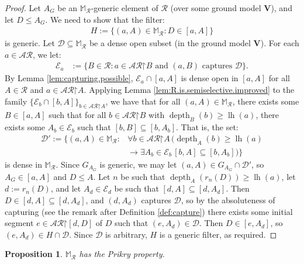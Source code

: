 \documentclass[10pt,a4paper]{amsart}
\theoremstyle{plain}
\numberwithin{equation}{section}
\newtheorem{proposition}[theorem]{Proposition}
\theoremstyle{definition}
\newcommand{\func}{\operatorname}
\newcommand{\cal}{\mathcal}
\renewcommand{\bf}{\mathbf}
\newcommand{\restrictedto}{\mathord{\upharpoonright}}
\newcommand{\V}{\bf{V}}
\newcommand{\lh}{\func{lh}}
\newcommand{\depth}{\func{depth}}
\newcommand{\D}{\cal{D}}
\newcommand{\E}{\cal{E}}
\begin{document}
\begin{proof}
    Let $A_G$ be an $\mathbb{M}_\cal{R}$-generic element of $\cal{R}$ (over some ground model $\V$), and let $D \leq A_G$. We need to show that the filter:
    \begin{align*}
        H := \{(a,A) \in \mathbb{M}_\cal{R} : D \in [a,A]\}
    \end{align*}
    is generic. Let $\D \subseteq \mathbb{M}_\cal{R}$ be a dense open subset (in the ground model $\V$). For each $a \in \cal{AR}$, we let:
    \begin{align*}
        \E_a &:= \{B \in \cal{R} : a \in \cal{AR}\restrictedto B \text{ and $(a,B)$ captures $\D$}\}.
    \end{align*}
    By Lemma \ref{lem:capturing.possible}, $\E_a \cap [a,A]$ is dense open in $[a,A]$ for all $A \in \cal{R}$ and $a \in \cal{AR}\restrictedto A$. Applying Lemma \ref{lem:R.is.semiselective.improved} to the family $\{\E_b \cap [b,A]\}_{b \in \cal{AR}\restrictedto A}$, we have that for all $(a,A) \in \mathbb{M}_\cal{R}$, there exists some $B \in [a,A]$ such that for all $b \in \cal{AR}\restrictedto B$ with $\depth_B(b) \geq \lh(a)$, there exists some $A_b \in \E_b$ such that $[b,B] \subseteq [b,A_b]$. That is, the set:
    \begin{align*}
        \D' := \{(a,A) \in \mathbb{M}_\cal{R} : {}&\forall b \in \cal{AR}\restrictedto A \, (\depth_A(b) \geq \lh(a) \\
        &\to \exists A_b \in \E_b \, [b,A] \subseteq [b,A_b])\}
    \end{align*}
    is dense in $\mathbb{M}_\cal{R}$. Since $G_{A_G}$ is generic, we may let $(a,A) \in G_{A_G} \cap \D'$, so $A_G \in [a,A]$ and $D \leq A$. Let $n$ be such that $\depth_A(r_n(D)) \geq \lh(a)$, let $d := r_n(D)$, and let $A_d \in \E_d$ be such that $[d,A] \subseteq [d,A_d]$. Then $D \in [d,A] \subseteq [d,A_d]$, and $(d,A_d)$ captures $\D$, so by the absoluteness of capturing (see the remark after Definition \ref{def:capture}) there exists some initial segment $e \in \cal{AR}\restrictedto[d,D]$ of $D$ such that $(e,A_d) \in \D$. Then $D \in [e,A_d]$, so $(e,A_d) \in H \cap \D$. Since $\D$ is arbitrary, $H$ is a generic filter, as required.
\end{proof}

\begin{proposition}
\label{prop:semiselective.implies.Prikry}
    $\mathbb{M}_\cal{R}$ has the Prikry property.
\end{proposition}
\end{document}
